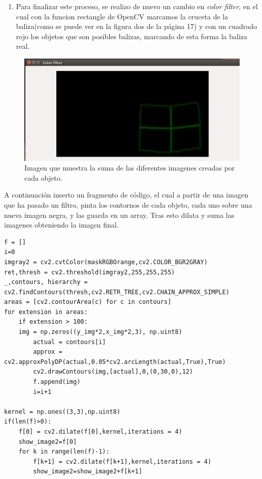 \begin{enumerate}
	\item Para finalizar este proceso, se realizo de nuevo un cambio en \textit{color filter}, en el cual con la funcion rectangle de OpenCV marcamos la cruceta de la baliza(como se puede ver en la figura dos de la p\'agina 17) y con un cuadrado rojo los objetos que son posibles balizas, marcando de esta forma la baliza real.
\end{enumerate}
\vspace{2mm}
\begin{figure}[ht]
	\centering
		\includegraphics[width=1.1\textwidth]{imgs/k_Beacon1.eps}
		\caption{Imagen que muestra la suma de las diferentes imagenes creadas por cada objeto.}
	\label{fig:k_Beacon1}
\end{figure}
\vspace{3mm}

\hspace{1cm} A continuaci\'on inserto un fragmento de c\'odigo, el cual a partir de una imagen que ha pasado un filtro, pinta los contornos de cada objeto, cada uno sobre una nueva imagen negra, y las guarda en un array. Tras esto dilata y suma las imagenes obteniendo la imagen final.

\begin{verbatim}
f = []
i=0
imgray2 = cv2.cvtColor(maskRGBOrange,cv2.COLOR_BGR2GRAY)
ret,thresh = cv2.threshold(imgray2,255,255,255)
_,contours, hierarchy = cv2.findContours(thresh,cv2.RETR_TREE,cv2.CHAIN_APPROX_SIMPLE)
areas = [cv2.contourArea(c) for c in contours]
for extension in areas:
    if extension > 100:
    img = np.zeros((y_img*2,x_img*2,3), np.uint8)
        actual = contours[i]
        approx = cv2.approxPolyDP(actual,0.05*cv2.arcLength(actual,True),True)
        cv2.drawContours(img,[actual],0,(0,30,0),12)
        f.append(img)
        i=i+1
			
kernel = np.ones((3,3),np.uint8)
if(len(f)>0):
    f[0] = cv2.dilate(f[0],kernel,iterations = 4)
    show_image2=f[0]
    for k in range(len(f)-1):
        f[k+1] = cv2.dilate(f[k+1],kernel,iterations = 4)
        show_image2=show_image2+f[k+1]
		
\end{verbatim}

